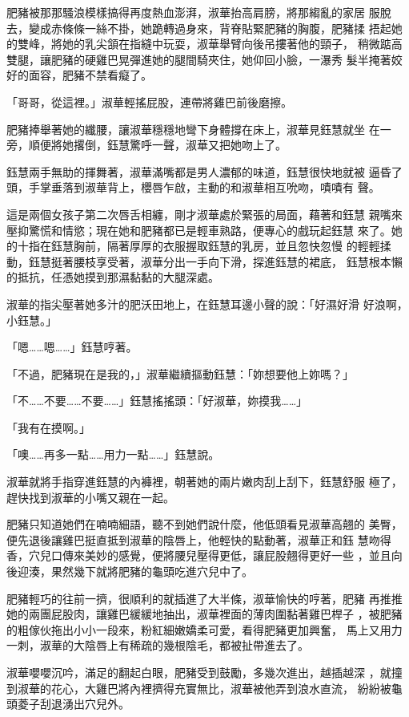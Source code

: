 肥豬被那那騷浪模樣搞得再度熱血澎湃，淑華抬高肩膀，將那縐亂的家居
服脫去，變成赤條條一絲不掛，她跪轉過身來，背脊貼緊肥豬的胸腹，肥豬揉
捂起她的雙峰，將她的乳尖頷在指縫中玩耍，淑華舉臂向後吊摟著他的頸子，
稍微踮高雙腿，讓肥豬的硬雞巴晃彈進她的腿間騎夾住，她仰回小臉，一瀑秀
髮半掩著姣好的面容，肥豬不禁看癡了。

「哥哥，從這裡。」淑華輕搖屁股，連帶將雞巴前後磨擦。

肥豬捧舉著她的纖腰，讓淑華穩穩地彎下身體撐在床上，淑華見鈺慧就坐
在一旁，順便將她撂倒，鈺慧驚呼一聲，淑華又把她吻上了。

鈺慧兩手無助的揮舞著，淑華滿嘴都是男人濃郁的味道，鈺慧很快地就被
逼昏了頭，手掌垂落到淑華背上，櫻唇乍啟，主動的和淑華相互吮吻，嘖嘖有
聲。

這是兩個女孩子第二次唇舌相纏，剛才淑華處於緊張的局面，藉著和鈺慧
親嘴來壓抑驚慌和情慾；現在她和肥豬都已是輕車熟路，便專心的戲玩起鈺慧
來了。她的十指在鈺慧胸前，隔著厚厚的衣服握取鈺慧的乳房，並且忽快忽慢
的輕輕揉動，鈺慧挺著腰枝享受著，淑華分出一手向下滑，探進鈺慧的裙底，
鈺慧根本懶的抵抗，任憑她摸到那濕黏黏的大腿深處。

淑華的指尖壓著她多汁的肥沃田地上，在鈺慧耳邊小聲的說：「好濕好滑
好浪啊，小鈺慧。」

「嗯……嗯……」鈺慧哼著。

「不過，肥豬現在是我的，」淑華繼續摳動鈺慧：「妳想要他上妳嗎？」

「不……不要……不要……」鈺慧搖搖頭：「好淑華，妳摸我……」

「我有在摸啊。」

「噢……再多一點……用力一點……」鈺慧說。

淑華就將手指穿進鈺慧的內褲裡，朝著她的兩片嫩肉刮上刮下，鈺慧舒服
極了，趕快找到淑華的小嘴又親在一起。

肥豬只知道她們在喃喃細語，聽不到她們說什麼，他低頭看見淑華高翹的
美臀，便先退後讓雞巴挺直抵到淑華的陰唇上，他輕快的點動著，淑華正和鈺
慧吻得香，穴兒口傳來美妙的感覺，便將腰兒壓得更低，讓屁股翹得更好一些
，並且向後迎湊，果然幾下就將肥豬的龜頭吃進穴兒中了。

肥豬輕巧的往前一擠，很順利的就插進了大半條，淑華愉快的哼著，肥豬
再推推她的兩團屁股肉，讓雞巴緩緩地抽出，淑華裡面的薄肉圍黏著雞巴桿子
，被肥豬的粗傢伙拖出小小一段來，粉紅細嫩嬌柔可愛，看得肥豬更加興奮，
馬上又用力一刺，淑華的大陰唇上有稀疏的幾根陰毛，都被扯帶進去了。

淑華嚶嚶沉吟，滿足的翻起白眼，肥豬受到鼓勵，多幾次進出，越插越深
，就撞到淑華的花心，大雞巴將內裡擠得充實無比，淑華被他弄到浪水直流，
紛紛被龜頭菱子刮退湧出穴兒外。

